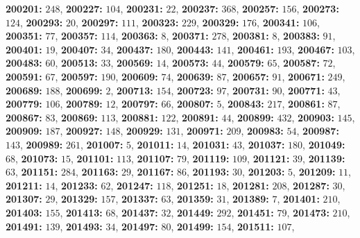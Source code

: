 \textsf{\bfseries 200201:} $248$, \textsf{\bfseries 200227:} $104$, \textsf{\bfseries 200231:} $22$, \textsf{\bfseries 200237:} $368$, \textsf{\bfseries 200257:} $156$, \textsf{\bfseries 200273:} $124$, \textsf{\bfseries 200293:} $20$, \textsf{\bfseries 200297:} $111$, \textsf{\bfseries 200323:} $229$, \textsf{\bfseries 200329:} $176$, \textsf{\bfseries 200341:} $106$, \textsf{\bfseries 200351:} $77$, \textsf{\bfseries 200357:} $114$, \textsf{\bfseries 200363:} $8$, \textsf{\bfseries 200371:} $278$, \textsf{\bfseries 200381:} $8$, \textsf{\bfseries 200383:} $91$, \textsf{\bfseries 200401:} $19$, \textsf{\bfseries 200407:} $34$, \textsf{\bfseries 200437:} $180$, \textsf{\bfseries 200443:} $141$, \textsf{\bfseries 200461:} $193$, \textsf{\bfseries 200467:} $103$, \textsf{\bfseries 200483:} $60$, \textsf{\bfseries 200513:} $33$, \textsf{\bfseries 200569:} $14$, \textsf{\bfseries 200573:} $44$, \textsf{\bfseries 200579:} $65$, \textsf{\bfseries 200587:} $72$, \textsf{\bfseries 200591:} $67$, \textsf{\bfseries 200597:} $190$, \textsf{\bfseries 200609:} $74$, \textsf{\bfseries 200639:} $87$, \textsf{\bfseries 200657:} $91$, \textsf{\bfseries 200671:} $249$, \textsf{\bfseries 200689:} $188$, \textsf{\bfseries 200699:} $2$, \textsf{\bfseries 200713:} $154$, \textsf{\bfseries 200723:} $97$, \textsf{\bfseries 200731:} $90$, \textsf{\bfseries 200771:} $43$, \textsf{\bfseries 200779:} $106$, \textsf{\bfseries 200789:} $12$, \textsf{\bfseries 200797:} $66$, \textsf{\bfseries 200807:} $5$, \textsf{\bfseries 200843:} $217$, \textsf{\bfseries 200861:} $87$, \textsf{\bfseries 200867:} $83$, \textsf{\bfseries 200869:} $113$, \textsf{\bfseries 200881:} $122$, \textsf{\bfseries 200891:} $44$, \textsf{\bfseries 200899:} $432$, \textsf{\bfseries 200903:} $145$, \textsf{\bfseries 200909:} $187$, \textsf{\bfseries 200927:} $148$, \textsf{\bfseries 200929:} $131$, \textsf{\bfseries 200971:} $209$, \textsf{\bfseries 200983:} $54$, \textsf{\bfseries 200987:} $143$, \textsf{\bfseries 200989:} $261$, \textsf{\bfseries 201007:} $5$, \textsf{\bfseries 201011:} $14$, \textsf{\bfseries 201031:} $43$, \textsf{\bfseries 201037:} $180$, \textsf{\bfseries 201049:} $68$, \textsf{\bfseries 201073:} $15$, \textsf{\bfseries 201101:} $113$, \textsf{\bfseries 201107:} $79$, \textsf{\bfseries 201119:} $109$, \textsf{\bfseries 201121:} $39$, \textsf{\bfseries 201139:} $63$, \textsf{\bfseries 201151:} $284$, \textsf{\bfseries 201163:} $29$, \textsf{\bfseries 201167:} $86$, \textsf{\bfseries 201193:} $30$, \textsf{\bfseries 201203:} $5$, \textsf{\bfseries 201209:} $11$, \textsf{\bfseries 201211:} $14$, \textsf{\bfseries 201233:} $62$, \textsf{\bfseries 201247:} $118$, \textsf{\bfseries 201251:} $18$, \textsf{\bfseries 201281:} $208$, \textsf{\bfseries 201287:} $30$, \textsf{\bfseries 201307:} $29$, \textsf{\bfseries 201329:} $157$, \textsf{\bfseries 201337:} $63$, \textsf{\bfseries 201359:} $31$, \textsf{\bfseries 201389:} $7$, \textsf{\bfseries 201401:} $210$, \textsf{\bfseries 201403:} $155$, \textsf{\bfseries 201413:} $68$, \textsf{\bfseries 201437:} $32$, \textsf{\bfseries 201449:} $292$, \textsf{\bfseries 201451:} $79$, \textsf{\bfseries 201473:} $210$, \textsf{\bfseries 201491:} $139$, \textsf{\bfseries 201493:} $34$, \textsf{\bfseries 201497:} $80$, \textsf{\bfseries 201499:} $154$, \textsf{\bfseries 201511:} $107$, 
